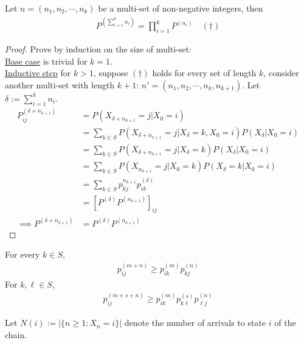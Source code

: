 \documentclass{article}
\begin{document}
    \begin{theorem}
    	Let $n = (n_1, n_2, \cdots, n_k)$ be a multi-set of non-negative integers, then
    	\begin{align}
    		P^{(\sum_{i=1}^k n_i)} = \prod_{i=1}^k P^{(n_i)}\quad (\dagger)
    	\end{align}
    \end{theorem}
    
    \begin{proof}
    	Prove by induction on the size of multi-set: \\
    	\ul{Base case} is trivial for $k=1$. \\
    	\ul{Inductive step} for $k > 1$, suppose $(\dagger)$ holds for every set of length $k$, consider another multi-set with length $k+1$: $n' = (n_1, n_2, \cdots, n_k, n_{k+1})$. Let $\delta := \sum_{i=1}^k n_i$.
    	\begin{align}
    		P^{(\delta + n_{k+1})}_{ij}
    		&= P(X_{\delta + n_{k+1}}=j|X_0=i) \\
    		&= \sum_{k \in S} P(X_{\delta + n_{k+1}}=j|X_\delta=k, X_0=i) P(X_\delta | X_0=i) \\
    		&= \sum_{k \in S} P(X_{\delta + n_{k+1}}=j|X_\delta=k) P(X_\delta | X_0=i) \\
    		&= \sum_{k \in S} P(X_{n_{k+1}}=j|X_0=k) P(X_\delta=k | X_0=i) \\
    		&= \sum_{k \in S} p^{n_{k+1}}_{kj} p^{(\delta)}_{ik} \\
    		&= [P^{(\delta)} P^{(n_{k+1})}]_{ij} \\
    		\implies P^{(\delta + n_{k+1})} &= P^{(\delta)} P^{(n_{k+1})}
    	\end{align}
    \end{proof}
    
    \begin{corollary}
    	For every $k \in S$,
    	\begin{align}
    		p_{ij}^{(m+n)} \geq p_{ik}^{(m)} p_{kj}^{(n)}
    	\end{align}
    	For $k,\ell \in S$,
    	\begin{align}
    		p_{ij}^{(m+s+n)} \geq p_{ik}^{(m)} p_{k\ell}^{(s)} p_{\ell j}^{(n)}
    	\end{align}
    \end{corollary}
    
    \begin{notation}
    	Let $N(i) := |\{n \geq 1: X_n = i\}|$ denote the number of arrivals to state $i$ of the chain.
    \end{notation}
    
\end{document}
